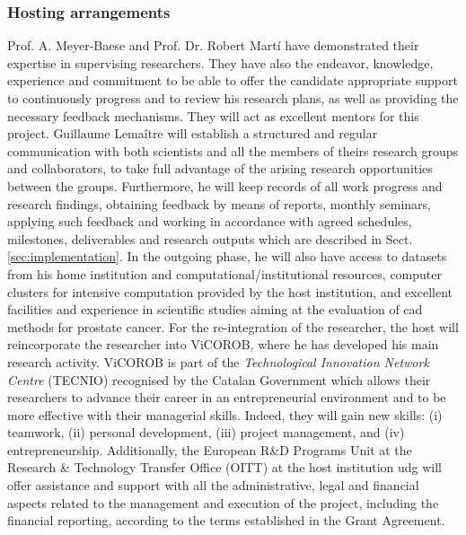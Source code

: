

\subsubsection*{Hosting arrangements}

Prof. A. Meyer-Baese and Prof. Dr. Robert Mart\'i have demonstrated their expertise in supervising researchers. They have also the endeavor, knowledge, experience and commitment to be able to offer the candidate appropriate support to continuously progress and to review his research plans, as well as providing the necessary feedback mechanisms. They will act as excellent mentors for this project.
Guillaume Lema\^itre will establish a structured and regular communication with both scientists and all the members of theirs research groups and collaborators, to take full advantage of the arising research opportunities between the groups. Furthermore, he will keep records of all work progress and research findings, obtaining feedback by means of reports, monthly seminars, applying such feedback and working in accordance with agreed schedules, milestones, deliverables and research outputs which are described in Sect.\,\ref{sec:implementation}.
In the outgoing phase, he will also have access to datasets from his home institution and computational/institutional resources, computer clusters for intensive computation provided by the host institution, and excellent facilities and experience in scientific studies aiming at the evaluation of \ac{cad} methods for prostate cancer. 
For the re-integration of the researcher, the host will reincorporate the researcher into ViCOROB, where he has developed his main research activity. 
ViCOROB is part of the \emph{Technological Innovation Network Centre} (TECNIO) recognised by the Catalan Government which allows their researchers to advance their career in an entrepreneurial environment and to be more effective with their managerial skills.
Indeed, they will gain new skills: (i) teamwork, (ii) personal development, (iii) project management, and (iv) entrepreneurship.
Additionally, the European R\&D Programs Unit at the Research \& Technology Transfer Office (OITT) at the host institution \ac{udg} will offer assistance and support with all the administrative, legal and financial aspects related to the management and execution of the project, including the financial reporting, according to the terms established in the Grant Agreement.

